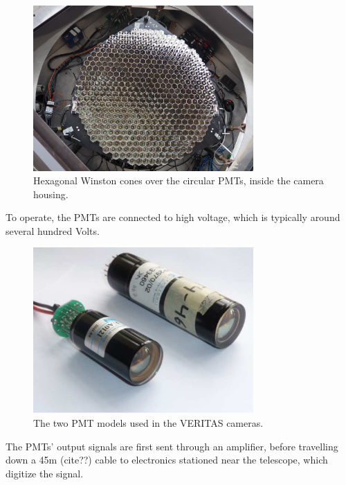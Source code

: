 \begin{figure}[h]
  \begin{center}
    \includegraphics[width=0.75\textwidth]{images/winston_cones_t2}
    \caption[Winston Cones]{Hexagonal Winston cones over the circular PMTs, inside the camera housing.}\label{fig:winstcones}
  \end{center}
\end{figure}

To operate, the PMTs are connected to high voltage, which is typically around several hundred Volts.

\begin{figure}[h]
  \begin{center}
    \includegraphics[width=0.75\textwidth]{images/pmt_models}
    \caption[PMT Models]{The two PMT models used in the VERITAS cameras. \cite{pmtmodels}}\label{fig:pmtmodels}
  \end{center}
\end{figure}

The PMTs' output signals are first sent through an amplifier, before travelling down a \nicetilde45m (cite??) cable to electronics stationed near the telescope, which digitize the signal.

